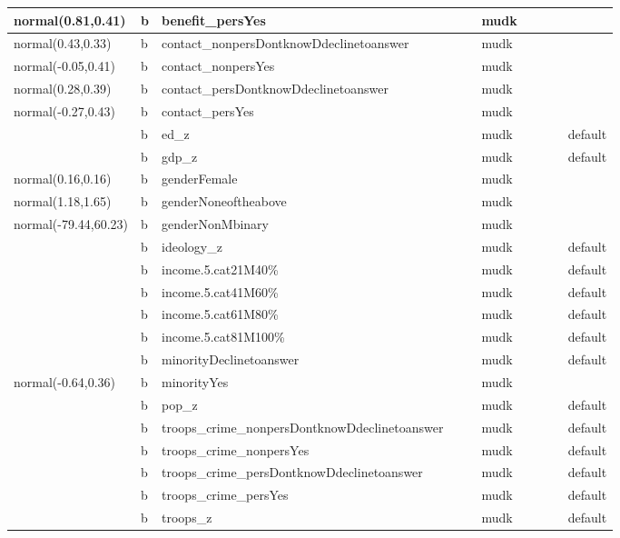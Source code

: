 \documentclass[
]{book}
\theoremstyle{definition}
\theoremstyle{definition}
\theoremstyle{definition}
\theoremstyle{definition}
\theoremstyle{remark}
\begin{document}
\begin{table}
\begin{tabular}[t]{l|l|l|l|l|l|l|l|l|l}
\hline
normal(0.81,0.41) & b & benefit\_persYes &  &  & mudk &  &  &  & \\
\hline
normal(0.43,0.33) & b & contact\_nonpersDontknowDdeclinetoanswer &  &  & mudk &  &  &  & \\
\hline
normal(-0.05,0.41) & b & contact\_nonpersYes &  &  & mudk &  &  &  & \\
\hline
normal(0.28,0.39) & b & contact\_persDontknowDdeclinetoanswer &  &  & mudk &  &  &  & \\
\hline
normal(-0.27,0.43) & b & contact\_persYes &  &  & mudk &  &  &  & \\
\hline
 & b & ed\_z &  &  & mudk &  &  &  & default\\
\hline
 & b & gdp\_z &  &  & mudk &  &  &  & default\\
\hline
normal(0.16,0.16) & b & genderFemale &  &  & mudk &  &  &  & \\
\hline
normal(1.18,1.65) & b & genderNoneoftheabove &  &  & mudk &  &  &  & \\
\hline
normal(-79.44,60.23) & b & genderNonMbinary &  &  & mudk &  &  &  & \\
\hline
 & b & ideology\_z &  &  & mudk &  &  &  & default\\
\hline
 & b & income.5.cat21M40\% &  &  & mudk &  &  &  & default\\
\hline
 & b & income.5.cat41M60\% &  &  & mudk &  &  &  & default\\
\hline
 & b & income.5.cat61M80\% &  &  & mudk &  &  &  & default\\
\hline
 & b & income.5.cat81M100\% &  &  & mudk &  &  &  & default\\
\hline
 & b & minorityDeclinetoanswer &  &  & mudk &  &  &  & default\\
\hline
normal(-0.64,0.36) & b & minorityYes &  &  & mudk &  &  &  & \\
\hline
 & b & pop\_z &  &  & mudk &  &  &  & default\\
\hline
 & b & troops\_crime\_nonpersDontknowDdeclinetoanswer &  &  & mudk &  &  &  & default\\
\hline
 & b & troops\_crime\_nonpersYes &  &  & mudk &  &  &  & default\\
\hline
 & b & troops\_crime\_persDontknowDdeclinetoanswer &  &  & mudk &  &  &  & default\\
\hline
 & b & troops\_crime\_persYes &  &  & mudk &  &  &  & default\\
\hline
 & b & troops\_z &  &  & mudk &  &  &  & default\\

\end{tabular}
\end{table}
\end{document}
